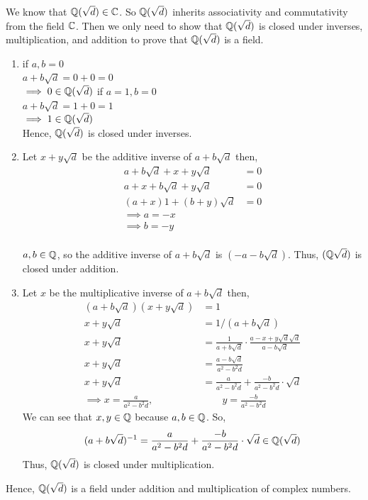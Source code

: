 \documentclass[12pt]{article}
\begin{document}
\begin{solution}
    \bbni 
    \bbni 
    We know that $\mathbb Q (\sqrt{d}) \in \mathbb C$. So $\mathbb Q(\sqrt{d})$ inherits associativity and commutativity from the field $\mathbb C$. Then we only need to show that $\mathbb Q(\sqrt{d})$ is closed under inverses, multiplication, and addition to prove that $\mathbb Q(\sqrt{d})$ is a field. 
    \begin{enumerate}
        \item if $a, b = 0$ \\
            $a + b\sqrt{d} = 0 + 0 = 0$ \\ 
            $\implies 0 \in \mathbb Q(\sqrt{d})$
            \bbni 
            if $a = 1, b = 0$ \\
            $a + b\sqrt{d} = 1 + 0 = 1$ \\ 
            $\implies 1 \in \mathbb Q(\sqrt{d})$ \\
            Hence, $\mathbb Q(\sqrt{d})$ is closed under inverses. 
        \item Let $x + y \sqrt{d}$ be the additive inverse of $a+ b \sqrt{d}$ then, \\
        \begin{align*}
            a + b\sqrt{d} + x + y\sqrt{d} &= 0\\
            a + x + b\sqrt{d} + y\sqrt{d} &= 0 \\
            (a + x)1 +  (b + y)\sqrt{d} &= 0 \\ 
            \implies a = -x \\ 
            \implies b = -y \\             
        \end{align*}

        $a, b \in \mathbb Q$, so the additive inverse of $a + b\sqrt{d}$  is  $(-a - b\sqrt{d})$. Thus, $(\mathbb Q\sqrt{d})$ is closed under addition. 

        \newpage
        \item Let $x$ be the multiplicative inverse of $a+ b \sqrt{d}$ then, \\
        \begin{align*}
           ( a + b\sqrt{d} )(x + y\sqrt{d})&= 1\\
           x + y\sqrt{d}&= 1 / ( a + b\sqrt{d} ) \\
           x + y\sqrt{d} &= \frac{1}{a + b \sqrt{d}} \cdot \frac{a - x + y\sqrt{d}\sqrt{d}}{a - b\sqrt{d}}\\ 
           x + y\sqrt{d} &= \frac{a - b\sqrt{d}}{a^2 - b^2d} \\
           x + y\sqrt{d} &= \frac{a}{a^2 - b^2d} + \frac{-b}{a^2 -b^2d} \cdot \sqrt{d} \\
           \implies x = \frac{a}{a^2 - b^2d}, &\qquad y = \frac{-b}{a^2 -b^2d}  
        \end{align*}
        We can see that $x, y \in \mathbb Q$ because $a, b \in \mathbb Q$. So,
        \[ (a+b\sqrt{d})^{-1} = \frac{a}{a^2 - b^2d} + \frac{-b}{a^2 -b^2d} \cdot \sqrt{d} \in \mathbb Q(\sqrt{d})\]        
        Thus, $\mathbb Q(\sqrt{d})$ is closed under multiplication. 
    \end{enumerate}
    Hence, $\mathbb Q(\sqrt{d})$ is a field under addition and multiplication of complex numbers. 
\end{solution}
\end{document}
